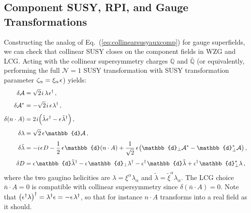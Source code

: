 \documentclass[12pt,document,nofootinbib,superscriptaddress,onecolumn,preprintnumbers,balancelastpage]{article}
\newcommand{\s}{\hspace{0.8pt}}
\newcommand{\PP}{\mathbb{d}}
\DeclareRobustCommand{\Eq}[1]{Eq.~(\ref{#1})}
\newcommand{\Q}{\mathbb{Q}}
\newcommand{\alc}{\mathcal{A}}
\begin{document}
\begin{spacing}{1.2}
\subsection{Component SUSY, RPI, and Gauge Transformations} 
\label{subsec:DcollSUSYtrans}

Constructing the analog of \Eq{eq:collinearsusyauxcomp} for gauge superfields, we can check that collinear SUSY closes on the component fields in WZG and LCG. 
%
Acting with the collinear supersymmetry charges $\Q$ and $\bar{\Q}$ (or equivalently, performing the full $\mathcal{N} = 1$ SUSY transformation with SUSY transformation parameter $\zeta_\alpha = \xi_\alpha\s \epsilon$) yields:  
%
\begin{align}
\delta \alc  &=   \sqrt{2}\s i\,    \lambda\s  \epsilon^\dagger    \,, \notag \\[3pt]
\delta \alc^* &=    - \sqrt{2}\s i\,  \epsilon\s \lambda^\dagger  \,, \notag\\[3pt]
\delta (n\cdot A) &=    2\s i \Big( \tilde{\lambda}\s \epsilon^\dagger - \epsilon\s \tilde{\lambda}^\dagger  \Big ) \,,\notag \\[3pt]
\delta \lambda &=  \sqrt{2}\,  \epsilon \s  \PP \alc  \,, \notag \\[3pt]
\delta \tilde{\lambda} &=   -  i\s \epsilon\s  D - \frac{1}{2}\, \epsilon\s \PP (n \cdot A)  + \frac{1}{\sqrt{2}}\,\epsilon\s \big( \PP_\perp \alc^* -  \PP_\perp^* \alc \big)  \,, \notag\\[3pt]
\delta D & =  \epsilon\s  \PP \tilde{\lambda}^\dagger -  \epsilon\s  \PP_\perp \lambda^\dagger  -  \epsilon^\dagger\s   \PP \tilde{\lambda}+ \epsilon^\dagger \s  \PP^*_\perp \lambda \,,
\label{eq:SUSYTransformGaugeComponents} 
\end{align}
%
where the two gaugino helicities are $\lambda = \xi^\alpha \lambda_\alpha$ and $\tilde{\lambda} = \tilde{\xi}^\alpha \lambda_\alpha$.
%
The LCG choice $\bar{n} \cdot A = 0$ is compatible with collinear supersymmetry since $\delta (\bar{n}\cdot A) = 0$.
%
Note that $\big(\epsilon^\dagger \lambda\big)^\dagger = \lambda^\dagger \epsilon = - \epsilon\s \lambda^\dagger$, so that for instance $n \cdot A$ transforms into a real field as it should.  
% 



\end{spacing}
\end{document}
